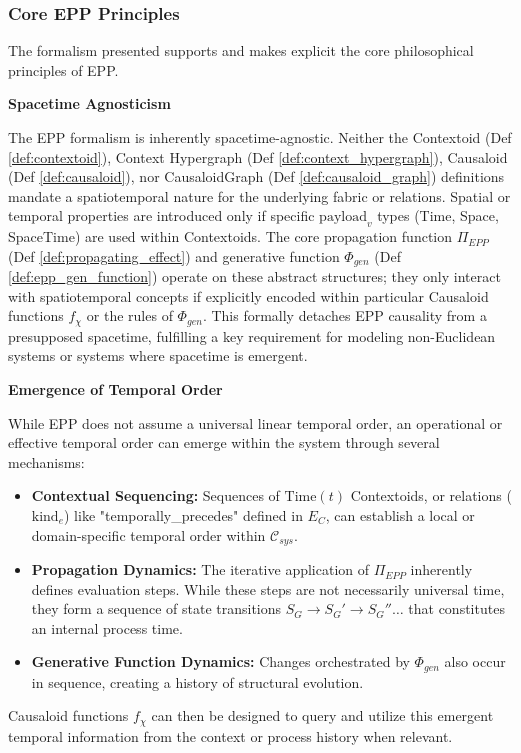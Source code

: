 \subsubsection[Core EPP Principles]{Core EPP Principles}
\label{ssec:epp_principles_formal} 

    The formalism presented supports and makes explicit the core philosophical principles of EPP.

\textbf{Spacetime Agnosticism}
        
The EPP formalism is inherently spacetime-agnostic. Neither the Contextoid (Def \ref{def:contextoid}), Context Hypergraph (Def \ref{def:context_hypergraph}), Causaloid (Def \ref{def:causaloid}), nor CausaloidGraph (Def \ref{def:causaloid_graph}) definitions mandate a spatiotemporal nature for the underlying fabric or relations. Spatial or temporal properties are introduced only if specific \(\text{payload}_v\) types (Time, Space, SpaceTime) are used within Contextoids. The core propagation function \(\Pi_{EPP}\) (Def \ref{def:propagating_effect}) and generative function \(\Phi_{gen}\) (Def \ref{def:epp_gen_function}) operate on these abstract structures; they only interact with spatiotemporal concepts if explicitly encoded within particular Causaloid functions \(f_\chi\) or the rules of \(\Phi_{gen}\). This formally detaches EPP causality from a presupposed spacetime, fulfilling a key requirement for modeling non-Euclidean systems or systems where spacetime is emergent.

\textbf{Emergence of Temporal Order}
        
        While EPP does not assume a universal linear temporal order, an operational or effective temporal order can emerge within the system through several mechanisms:
        \begin{itemize}
            \item \textbf{Contextual Sequencing:} Sequences of \(\text{Time}(t)\) Contextoids, or relations (\(\text{kind}_e\)) like "temporally\_precedes" defined in \(E_C\), can establish a local or domain-specific temporal order within \(\mathcal{C}_{sys}\).
            \item \textbf{Propagation Dynamics:} The iterative application of \(\Pi_{EPP}\) inherently defines evaluation steps. While these steps are not necessarily universal time, they form a sequence of state transitions \(S_G \to S_G' \to S_G'' \dots\) that constitutes an internal process time.
            \item \textbf{Generative Function Dynamics:} Changes orchestrated by \(\Phi_{gen}\) also occur in sequence, creating a history of structural evolution.
        \end{itemize}
        Causaloid functions \(f_\chi\) can then be designed to query and utilize this emergent temporal information from the context or process history when relevant.


